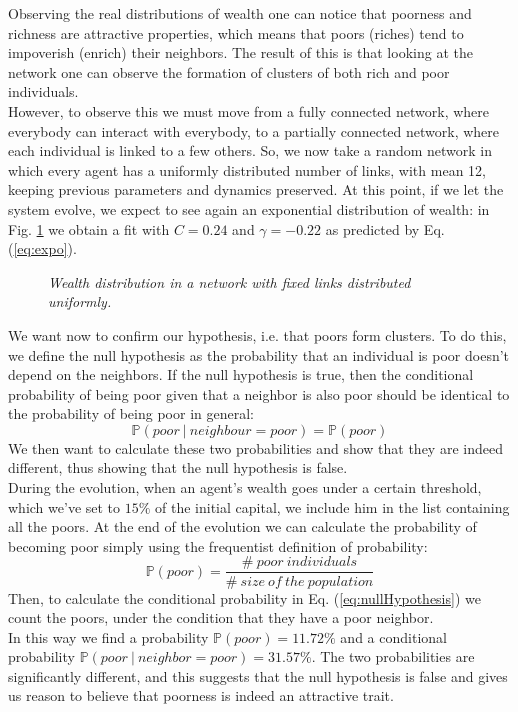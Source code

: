 Observing the real distributions of wealth one can notice that poorness and richness are attractive properties, which means that poors (riches) tend to impoverish (enrich) their neighbors.
The result of this is that looking at the network one can observe the formation of clusters of both rich and poor individuals. \\
However, to observe this we must move from a fully connected network, where everybody can interact with everybody, to a partially connected network, where each individual is linked to a few others.
So, we now take a random network in which every agent has a uniformly distributed number of links, with mean 12, keeping previous parameters and dynamics preserved.
At this point, if we let the system evolve, we expect to see again an exponential distribution of wealth: in Fig. \ref{fig:fixedExpo} we obtain a fit with $C = 0.24$ and $\gamma = -0.22$ as predicted by Eq. (\ref{eq:expo}).
\begin{figure}[H]
    \centering
    \scalebox{.7}{}
    \caption{\emph{Wealth distribution in a network with fixed links distributed uniformly.}}
    \label{fig:fixedExpo}
\end{figure}
We want now to confirm our hypothesis, i.e. that poors form clusters.
To do this, we define the null hypothesis as the probability that an individual is poor doesn't depend on the neighbors.
If the null hypothesis is true, then the conditional probability of being poor given that a neighbor is also poor should be identical to the probability of being poor in general:
\begin{equation}
    \mathbb{P}(poor \ | \ neighbour=poor) = \mathbb{P}(poor)
	\label{eq:nullHypothesis}
\end{equation}
We then want to calculate these two probabilities and show that they are indeed different, thus showing that the null hypothesis is false. \\
During the evolution, when an agent's wealth goes under a certain threshold, which we've set to $15 \%$ of the initial capital, we include him in the list containing all the poors.
At the end of the evolution we can calculate the probability of becoming poor simply using the frequentist definition of probability:
$$
	\mathbb{P}(poor) = \frac{\# \ poor \ individuals}{\# \ size \ of \ the \ population}
$$
Then, to calculate the conditional probability in Eq. (\ref{eq:nullHypothesis}) we count the poors, under the condition that they have a poor neighbor. \\
In this way we find a probability $\mathbb{P}(poor) = 11.72 \%$ and a conditional probability $\mathbb{P}(poor \ | \ neighbor=poor) = 31.57 \%$.
The two probabilities are significantly different, and this suggests that the null hypothesis is false and gives us reason to believe that poorness is indeed an attractive trait.
